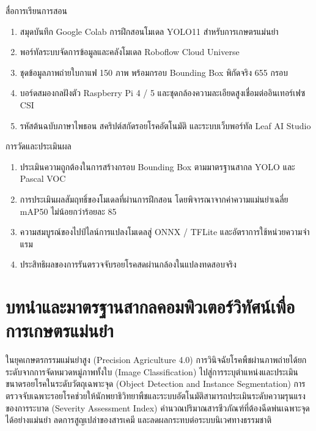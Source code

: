 \begin{planbox}{สื่อการเรียนการสอน}
\begin{enumerate}[topsep=2pt, itemsep=1pt, partopsep=0pt, parsep=0pt, leftmargin=1.5em]
    \item สมุดบันทึก Google Colab การฝึกสอนโมเดล YOLO11 สำหรับการเกษตรแม่นยำ
    \item พอร์ทัลระบบจัดการข้อมูลและคลังโมเดล Roboflow Cloud Universe
    \item ชุดข้อมูลภาพถ่ายใบกาแฟ 150 ภาพ พร้อมกรอบ Bounding Box พิกัดจริง 655 กรอบ
    \item บอร์ดสมองกลฝังตัว Raspberry Pi 4 / 5 และชุดกล้องความละเอียดสูงเชื่อมต่ออินเทอร์เฟซ CSI
    \item รหัสต้นฉบับภาษาไพธอน สคริปต์สกัดรอยโรคอัตโนมัติ และระบบเว็บพอร์ทัล Leaf AI Studio
\end{enumerate}
\end{planbox}

\begin{planbox}{การวัดและประเมินผล}
\begin{enumerate}[topsep=2pt, itemsep=1pt, partopsep=0pt, parsep=0pt, leftmargin=1.5em]
    \item ประเมินความถูกต้องในการสร้างกรอบ Bounding Box ตามมาตรฐานสากล YOLO และ Pascal VOC
    \item การประเมินผลสัมฤทธิ์ของโมเดลที่ผ่านการฝึกสอน โดยพิจารณาจากค่าความแม่นยำเฉลี่ย mAP50 ไม่น้อยกว่าร้อยละ 85
    \item ความสมบูรณ์ของไปป์ไลน์การแปลงโมเดลสู่ ONNX / TFLite และอัตราการใช้หน่วยความจำแรม
    \item ประสิทธิผลของการรันตรวจจับรอยโรคสดผ่านกล้องในแปลงทดสอบจริง
\end{enumerate}
\end{planbox}

\newpage

\section{บทนำและมาตรฐานสากลคอมพิวเตอร์วิทัศน์เพื่อการเกษตรแม่นยำ}

ในยุคเกษตรกรรมแม่นยำสูง (Precision Agriculture 4.0) การวินิจฉัยโรคพืชผ่านภาพถ่ายได้ยกระดับจากการจัดหมวดหมู่ภาพทั้งใบ (Image Classification) ไปสู่การระบุตำแหน่งและประเมินขนาดรอยโรคในระดับวัตถุเฉพาะจุด (Object Detection and Instance Segmentation) การตรวจจับเฉพาะรอยโรคช่วยให้นักพยาธิวิทยาพืชและระบบอัตโนมัติสามารถประเมินระดับความรุนแรงของการระบาด (Severity Assessment Index) คำนวณปริมาณสารชีวภัณฑ์ที่ต้องฉีดพ่นเฉพาะจุดได้อย่างแม่นยำ ลดการสูญเปล่าของสารเคมี และลดผลกระทบต่อระบบนิเวศทางธรรมชาติ


